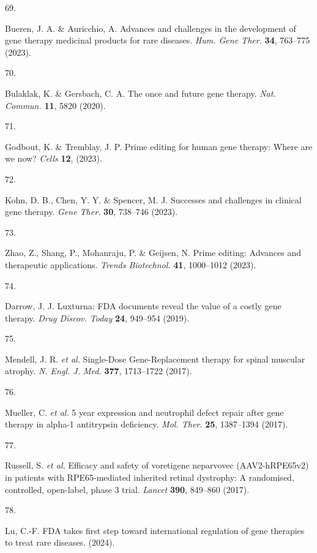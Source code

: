 \documentclass[
]{article}
\newlength{\cslhangindent}
\newlength{\csllabelwidth}
\newenvironment{CSLReferences}[2] %
 {\begin{list}{}{%
  \setlength{\itemindent}{0pt}
  \setlength{\leftmargin}{0pt}
  \setlength{\parsep}{0pt}
  \ifodd #1
   \setlength{\leftmargin}{\cslhangindent}
   \setlength{\itemindent}{-1\cslhangindent}
  \fi
  \setlength{\itemsep}{#2\baselineskip}}}
 {\end{list}}
\newcommand{\CSLLeftMargin}[1]{\parbox[t]{\csllabelwidth}{\strut#1\strut}}
\newcommand{\CSLRightInline}[1]{\parbox[t]{\linewidth - \csllabelwidth}{\strut#1\strut}}
\begin{document}
\begin{CSLReferences}{0}{0}
\CSLLeftMargin{69. }%
\CSLRightInline{Bueren, J. A. \& Auricchio, A. Advances and challenges
in the development of gene therapy medicinal products for rare diseases.
\emph{Hum. Gene Ther.} \textbf{34}, 763--775 (2023).}

\CSLLeftMargin{70. }%
\CSLRightInline{Bulaklak, K. \& Gersbach, C. A. The once and future gene
therapy. \emph{Nat. Commun.} \textbf{11}, 5820 (2020).}

\CSLLeftMargin{71. }%
\CSLRightInline{Godbout, K. \& Tremblay, J. P. Prime editing for human
gene therapy: Where are we now? \emph{Cells} \textbf{12}, (2023).}

\CSLLeftMargin{72. }%
\CSLRightInline{Kohn, D. B., Chen, Y. Y. \& Spencer, M. J. Successes and
challenges in clinical gene therapy. \emph{Gene Ther.} \textbf{30},
738--746 (2023).}

\CSLLeftMargin{73. }%
\CSLRightInline{Zhao, Z., Shang, P., Mohanraju, P. \& Geijsen, N. Prime
editing: Advances and therapeutic applications. \emph{Trends
Biotechnol.} \textbf{41}, 1000--1012 (2023).}

\CSLLeftMargin{74. }%
\CSLRightInline{Darrow, J. J. Luxturna: {FDA} documents reveal the value
of a costly gene therapy. \emph{Drug Discov. Today} \textbf{24},
949--954 (2019).}

\CSLLeftMargin{75. }%
\CSLRightInline{Mendell, J. R. \emph{et al.} {Single-Dose}
{Gene-Replacement} therapy for spinal muscular atrophy. \emph{N. Engl.
J. Med.} \textbf{377}, 1713--1722 (2017).}

\CSLLeftMargin{76. }%
\CSLRightInline{Mueller, C. \emph{et al.} 5 year expression and
neutrophil defect repair after gene therapy in alpha-1 antitrypsin
deficiency. \emph{Mol. Ther.} \textbf{25}, 1387--1394 (2017).}

\CSLLeftMargin{77. }%
\CSLRightInline{Russell, S. \emph{et al.} Efficacy and safety of
voretigene neparvovec ({AAV2-hRPE65v2}) in patients with
{RPE65-mediated} inherited retinal dystrophy: A randomised, controlled,
open-label, phase 3 trial. \emph{Lancet} \textbf{390}, 849--860 (2017).}

\CSLLeftMargin{78. }%
\CSLRightInline{Lu, C.-F. {FDA} takes first step toward international
regulation of gene therapies to treat rare diseases. (2024).}


\end{CSLReferences}
\end{document}
